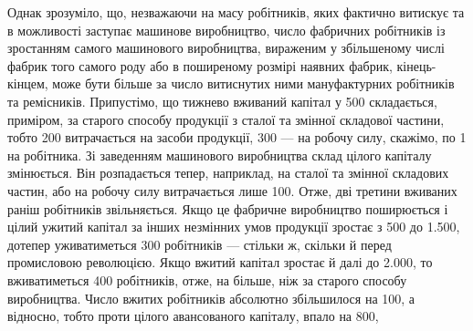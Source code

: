 Однак зрозуміло, що, незважаючи на масу робітників, яких фактично
витискує та в можливості заступає машинове виробництво,
число фабричних робітників із зростанням самого машинового виробництва,
вираженим у збільшеному числі фабрик того самого
роду або в поширеному розмірі наявних фабрик, кінець-кінцем,
може бути більше за число витиснутих ними мануфактурних робітників
та ремісників. Припустімо, що тижнево вживаний капітал
у 500 складається, приміром, за старого способу
продукції з  сталої та  змінної складової частини, тобто 200 витрачається на засоби продукції, 300 — на робочу силу, скажімо, по 1
на робітника. Зі заведенням машинового виробництва склад цілого
капіталу змінюється. Він розпадається тепер, наприклад, на 
сталої та  змінної складових частин, або на робочу силу витрачається
лише 100. Отже, дві третини вживаних
раніш робітників звільняється. Якщо це фабричне виробництво
поширюється і цілий ужитий капітал за інших незмінних умов
продукції зростає з 500 до \num{1.500}, дотепер уживатиметься 300 робітників
— стільки ж, скільки й перед промисловою революцією.
Якщо вжитий капітал зростає й далі до \num{2.000}, то вживатиметься
400 робітників, отже, на  більше, ніж за старого способу виробництва.
Число вжитих робітників абсолютно збільшилося на 100,
а відносно, тобто проти цілого авансованого капіталу, впало на 800,
\parbreak{}  %
